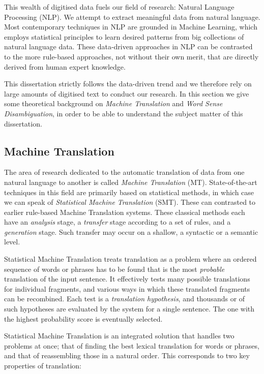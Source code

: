 This wealth of digitised data fuels our field of research: Natural Language
Processing (NLP). We attempt to extract meaningful data from natural language.
Most contemporary techniques in NLP are grounded in Machine Learning, which
employs statistical principles to learn desired patterns from big collections
of natural language data. These data-driven approaches in NLP can be contrasted
to the more rule-based approaches, not without their own merit, that are
directly derived from human expert knowledge.

This dissertation strictly follows the data-driven trend and we therefore rely
on large amounts of digitised text to conduct our research. In this section we
give some theoretical background on \emph{Machine Translation} and \emph{Word
Sense Disambiguation}, in order to be able to understand the subject matter of
this dissertation.

\subsection{Machine Translation}
\label{sec:intromt}

The area of research dedicated to the automatic translation of data from one
natural language to another is called \emph{Machine Translation} (MT).
State-of-the-art techniques in this field are primarily based on statistical
methods, in which case we can speak of \emph{Statistical Machine Translation}
(SMT). These can contrasted to earlier rule-based Machine Translation systems.
These classical methods each have an \emph{analysis} stage, a \emph{transfer}
stage according to a set of rules, and a \emph{generation} stage. Such transfer may occur on a shallow, a syntactic or a semantic level. 

Statistical Machine Translation treats translation as a problem where an
ordered sequence of words or phrases has to be found that is the most
\emph{probable} translation of the input sentence. It effectively tests many possible
translations for individual fragments, and various ways in which these
translated fragments can be recombined. Each test is a \emph{translation
hypothesis}, and thousands or of such hypotheses are evaluated by the system
for a single sentence. The one with the highest probability score is eventually
selected.

Statistical Machine Translation is an integrated solution that handles two
problems at once; that of finding the best lexical translation for words or
phrases, and that of reassembling those in a natural order. This corresponds to
two key properties of translation:


